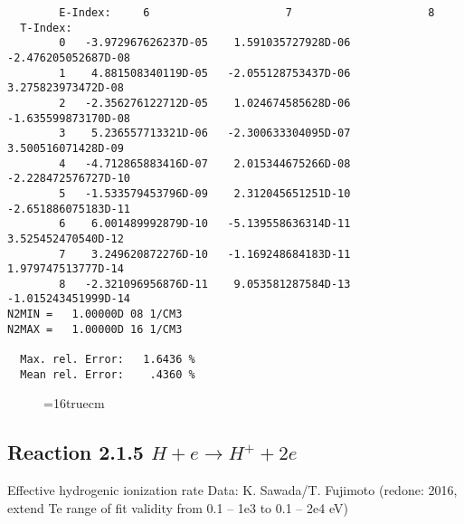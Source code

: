 \documentclass[12pt,dvipdfmx]{article}
\begin{document}
\begin{small}
\begin{verbatim}
        E-Index:     6                     7                     8
  T-Index:
        0   -3.972967626237D-05    1.591035727928D-06   -2.476205052687D-08
        1    4.881508340119D-05   -2.055128753437D-06    3.275823973472D-08
        2   -2.356276122712D-05    1.024674585628D-06   -1.635599873170D-08
        3    5.236557713321D-06   -2.300633304095D-07    3.500516071428D-09
        4   -4.712865883416D-07    2.015344675266D-08   -2.228472576727D-10
        5   -1.533579453796D-09    2.312045651251D-10   -2.651886075183D-11
        6    6.001489992879D-10   -5.139558636314D-11    3.525452470540D-12
        7    3.249620872276D-10   -1.169248684183D-11    1.979747513777D-14
        8   -2.321096956876D-11    9.053581287584D-13   -1.015243451999D-14
N2MIN =   1.00000D 08 1/CM3
N2MAX =   1.00000D 16 1/CM3

  Max. rel. Error:   1.6436 %
  Mean rel. Error:    .4360 %
\end{verbatim}\end{small}
\begin{figure} \label{2.1.5o}
\epsfxsize=16truecm
\end{figure}
\newpage


\subsection{
Reaction 2.1.5 $H + e \rightarrow H^+ + 2e $ }

   Effective hydrogenic ionization rate    Data: K. Sawada/T. Fujimoto (redone: 2016,
extend Te range of fit validity from 0.1 -- 1e3 to 0.1 -- 2e4 eV)
   \cite{kn:Sawada}
\end{document}
